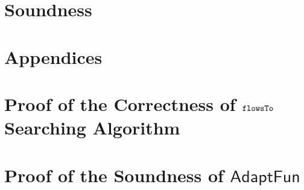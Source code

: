 \documentclass[a4paper,11pt]{article}
\newcommand{\THESYSTEM}{\textsf{AdaptFun}}
\begin{document}
\section{Soundness}

\clearpage
%
\appendix
{}
\section*{Appendices}
\section{Proof of the Correctness of $\mathtt{flowsTo}$ Searching Algorithm}

\section{Proof of the Soundness of $\THESYSTEM$}
% 



\end{document}

